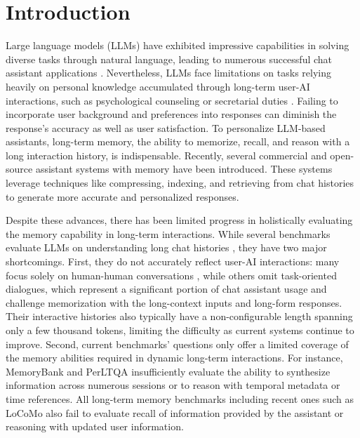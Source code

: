 \section{Introduction}

Large language models (LLMs) have exhibited impressive capabilities in solving diverse tasks through natural language, leading to numerous successful chat assistant applications \citep{openai2022chatgpt, microsoft2023copilot}. Nevertheless, LLMs face limitations on tasks relying heavily on personal knowledge accumulated through long-term user-AI interactions, such as psychological counseling or secretarial duties \citep{zhong2024memorybank}. Failing to incorporate user background and preferences into responses can diminish the response's accuracy as well as user satisfaction. To personalize LLM-based assistants, long-term memory, the ability to memorize, recall, and reason with a long interaction history, is indispensable. Recently, several commercial \citep{openai_memory_2024, coze_memory_2024} and open-source assistant systems with memory \citep{zhong2024memorybank, zhang2024cognitivekernelopensourceagent} have been introduced. These systems leverage techniques like compressing, indexing, and retrieving from chat histories to generate more accurate and personalized responses. 


Despite these advances, there has been limited progress in holistically evaluating the memory capability in long-term interactions. While several benchmarks evaluate LLMs on understanding long chat histories \citep{xu-etal-2022-beyond, xu-etal-2022-long, zhong2024memorybank, maharana-etal-2024-evaluating, du-etal-2024-perltqa, kim2024dialsimrealtimesimulatorevaluating}, they have two major shortcomings. First, they do not accurately reflect user-AI interactions: many focus solely on human-human conversations \citep{xu-etal-2022-beyond, maharana-etal-2024-evaluating, kim2024dialsimrealtimesimulatorevaluating}, while others omit task-oriented dialogues, which represent a significant portion of chat assistant usage and challenge memorization with the long-context inputs and long-form responses. Their interactive histories also typically have a non-configurable length spanning only a few thousand tokens, limiting the difficulty as current systems continue to improve. Second, current benchmarks' questions only offer a limited coverage of the memory abilities required in dynamic long-term interactions. For instance, MemoryBank \citep{zhong2024memorybank} and PerLTQA \citep{du-etal-2024-perltqa} insufficiently evaluate the ability to synthesize information across numerous sessions or to reason with temporal metadata or time references. All long-term memory benchmarks including recent ones such as LoCoMo \citep{maharana-etal-2024-evaluating} also fail to evaluate recall of information provided by the assistant or reasoning with updated user information.  

